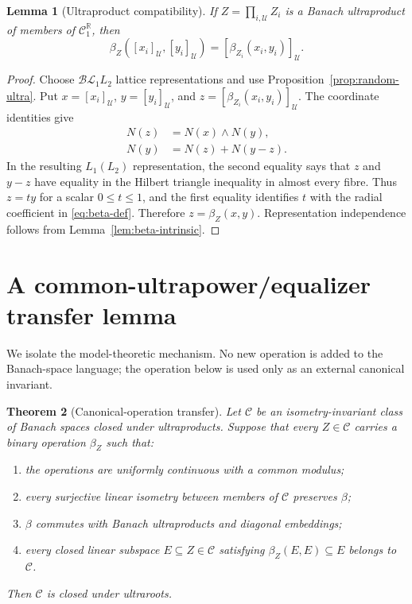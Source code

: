 \documentclass[11pt]{article}
\newcommand{\BL}{\mathcal{BL}}
\newcommand{\C}{\mathcal C}
\newcommand{\U}{\mathcal U}
\newcommand{\R}{\mathbb R}
\newcommand{\1}{\mathbf 1}
\newtheorem{theorem}{Theorem}[section]
\newtheorem{lemma}[theorem]{Lemma}
\theoremstyle{definition}
\theoremstyle{remark}
\begin{document}
\begin{lemma}[Ultraproduct compatibility]
\label{lem:beta-ultra}
If $Z=\prod_{i,\U}Z_i$ is a Banach ultraproduct of members of
$\C_1^{\R}$, then
\[
 \beta_Z([x_i]_{\U},[y_i]_{\U})
       =[\beta_{Z_i}(x_i,y_i)]_{\U}.
\]
\end{lemma}

\begin{proof}
Choose $\BL_1L_2$ lattice representations and use
Proposition~\ref{prop:random-ultra}.  Put
$x=[x_i]_{\U}$, $y=[y_i]_{\U}$, and
$z=[\beta_{Z_i}(x_i,y_i)]_{\U}$.  The coordinate identities give
\begin{align*}
 N(z)&=N(x)\wedge N(y),\\
 N(y)&=N(z)+N(y-z).
\end{align*}
In the resulting $L_1(L_2)$ representation, the second equality says that
$z$ and $y-z$ have equality in the Hilbert triangle inequality in almost
every fibre.  Thus $z=t y$ for a scalar $0\leq t\leq1$, and the first
equality identifies $t$ with the radial coefficient in
\eqref{eq:beta-def}.  Therefore $z=\beta_Z(x,y)$.  Representation
independence follows from Lemma~\ref{lem:beta-intrinsic}.
\end{proof}

\section{A common-ultrapower/equalizer transfer lemma}

We isolate the model-theoretic mechanism.  No new operation is added to the
Banach-space language; the operation below is used only as an external
canonical invariant.

\begin{theorem}[Canonical-operation transfer]
\label{thm:transfer}
Let $\C$ be an isometry-invariant class of Banach spaces closed under
ultraproducts.  Suppose that every $Z\in\C$ carries a binary operation
$\beta_Z$ such that:
\begin{enumerate}[label=\textup{(\alph*)}]
\item the operations are uniformly continuous with a common modulus;
\item every surjective linear isometry between members of $\C$ preserves
      $\beta$;
\item $\beta$ commutes with Banach ultraproducts and diagonal embeddings;
\item every closed linear subspace $E\subseteq Z\in\C$ satisfying
      $\beta_Z(E,E)\subseteq E$ belongs to $\C$.
\end{enumerate}
Then $\C$ is closed under ultraroots.
\end{theorem}
\end{document}
